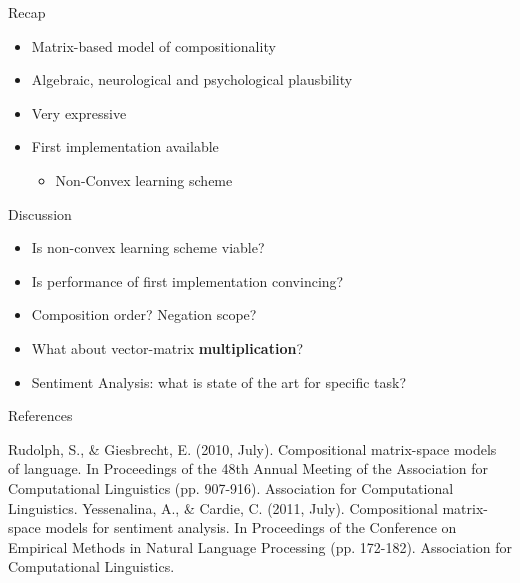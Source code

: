 \documentclass[12pt,a4paper]{beamer}
\begin{document}
\begin{frame}{Recap}
\begin{itemize}
\item Matrix-based model of compositionality
\item Algebraic, neurological and psychological plausbility
\item Very expressive
\item First implementation available
    \begin{itemize}
    \item Non-Convex learning scheme
    \end{itemize}
\end{itemize}
\end{frame}

\begin{frame}{Discussion}
\begin{itemize}
\item Is non-convex learning scheme viable?
\item Is performance of first implementation convincing?
\item Composition order? Negation scope? \cite{cmsmse} 
\item What about vector-matrix \textbf{multiplication}?
\item Sentiment Analysis: what is state of the art for specific task?
\end{itemize}
\end{frame}


\begin{frame}[allowframebreaks]{References}
\begin{thebibliography}{-}
 Rudolph, S., \& Giesbrecht, E. (2010, July). Compositional matrix-space models of language. In Proceedings of the 48th Annual Meeting of the Association for Computational Linguistics (pp. 907-916). Association for Computational Linguistics.
 Yessenalina, A., \& Cardie, C. (2011, July). Compositional matrix-space models for sentiment analysis. In Proceedings of the Conference on Empirical Methods in Natural Language Processing (pp. 172-182). Association for Computational Linguistics.
\end{thebibliography}
\end{frame}
\end{document}
